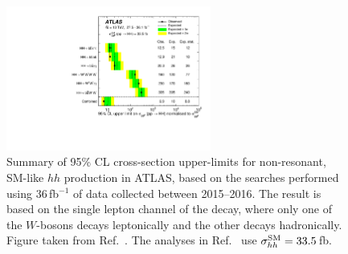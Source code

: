 \begin{figure}[!htb]
    \begin{center}
        \includegraphics[width=0.6\textwidth]{figures/search_hh/hh_intro/hh_comb_36}
        \caption{
            Summary of 95\% CL cross-section upper-limits for non-resonant, SM-like $hh$
            production in ATLAS, based on the searches performed using 36\,fb$^{-1}$ of
            data collected between 2015--2016.
            The \bbww result is based on the single lepton channel of the \bbww decay,
            where only one of the $W$-bosons decays leptonically and the other decays hadronically.
            Figure taken from Ref.~\cite{HHComb36}.
            The analyses in Ref.~\cite{HHComb36} use $\sigma_{hh}^{\text{SM}} = 33.5$\,fb.
        }
        \label{fig:hh_comb_36}
    \end{center}
\end{figure}

%
%






